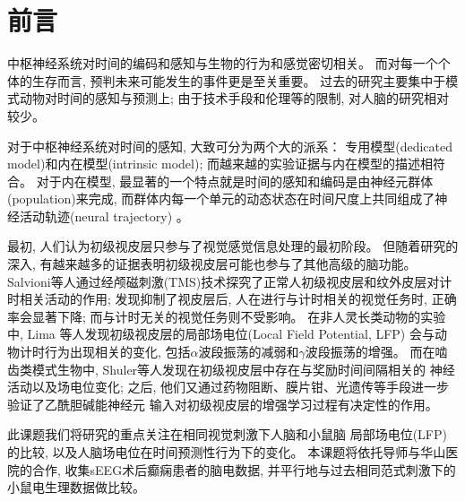 \chapter{前言}

中枢神经系统对时间的编码和感知与生物的行为和感觉密切相关。
而对每一个个体的生存而言, 预判未来可能发生的事件更是至关重要。
过去的研究主要集中于模式动物对时间的感知与预测上;
由于技术手段和伦理等的限制, 对人脑的研究相对较少。

对于中枢神经系统对时间的感知, 大致可分为两个大的派系：
专用模型(dedicated model)和内在模型(intrinsic model);
而越来越的实验证据与内在模型的描述相符合\cite{paton2018neural}。
对于内在模型, 最显著的一个特点就是时间的感知和编码是由神经元群体(population)来完成,
而群体内每一个单元的动态状态在时间尺度上共同组成了神经活动轨迹(neural trajectory)
\cite{buonomano2009state, remington2018dynamical}。

最初, 人们认为初级视皮层只参与了视觉感觉信息处理的最初阶段。
但随着研究的深入, 有越来越多的证据表明初级视皮层可能也参与了其他高级的脑功能。
Salvioni等人通过经颅磁刺激(TMS)技术探究了正常人初级视皮层和纹外皮层对计时相关活动的作用;
发现抑制了视皮层后, 人在进行与计时相关的视觉任务时,
正确率会显著下降; 而与计时无关的视觉任务则不受影响\cite{salvioni2013visual}。
在非人灵长类动物的实验中, Lima 等人发现初级视皮层的局部场电位(Local Field Potential, LFP)
会与动物计时行为出现相关的变化,
包括\(\alpha\)波段振荡的减弱和\(\gamma\)波段振荡的增强\cite{lima2011gamma}。
而在啮齿类模式生物中, Shuler等人发现在初级视皮层中存在与奖励时间间隔相关的
神经活动以及场电位变化\cite{chubykin2013cholinergic, shuler2006reward, zold2015theta};
之后, 他们又通过药物阻断、膜片钳、光遗传等手段进一步验证了乙酰胆碱能神经元
输入对初级视皮层的增强学习过程有决定性的作用\cite{chubykin2013cholinergic, liu2015selective, namboodiri2015visually}。

此课题我们将研究的重点关注在相同视觉刺激下人脑和小鼠脑
局部场电位(LFP)的比较, 以及人脑场电位在时间预测性行为下的变化。
本课题将依托导师与华山医院的合作, 收集sEEG术后癫痫患者的脑电数据,
并平行地与过去相同范式刺激下的小鼠电生理数据做比较。
